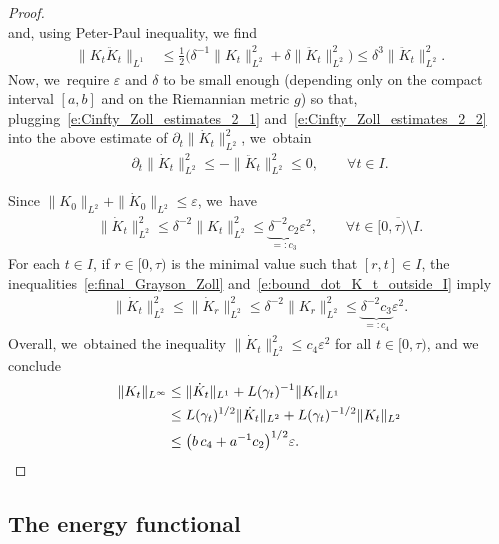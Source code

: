 \documentclass[11pt]{article}
\let\epsilon\varepsilon
\theoremstyle{plain}
\theoremstyle{definition}
\begin{document}
\begin{proof}
\begin{equation}
\end{equation}
and, using Peter-Paul inequality, we find
\begin{equation}
\label{e:Cinfty_Zoll_estimates_2_2}
\begin{split}
\|K_t \ddot K_t\|_{L^1}
&\leq
\tfrac12\big(\delta^{-1}\|K_t\|_{L^2}^2+ \delta\|\ddot K_t\|_{L^2}^2\big)
\leq
\delta^3 \|\ddot K_t\|_{L^2}^2.
\end{split}
\end{equation}
Now, we~require $\epsilon$ and $\delta$ to be small enough (depending only on the compact interval $[a,b]$ and on the Riemannian metric $g$) so that, plugging~\eqref{e:Cinfty_Zoll_estimates_2_1} and~\eqref{e:Cinfty_Zoll_estimates_2_2} into the above estimate of $\partial_t\|\dot K_t\|_{L^2}^2$, we~obtain
\begin{align}
\label{e:final_Grayson_Zoll}
\partial_t\|\dot K_t\|_{L^2}^2
\leq
-\|\ddot K_t\|_{L^2}^2
\leq
0,
\qquad\forall t\in I.
\end{align}

Since $\|K_0\|_{L^2}+\|\dot K_0\|_{L^2}\leq\epsilon$, we~have
\begin{align}
\label{e:bound_dot_K_t_outside_I}
\|\dot K_t\|_{L^2}^2\leq \delta^{-2}\|K_t\|_{L^2}^2\leq \underbrace{\delta^{-2}c_2}_{=:c_3}\epsilon^2,
\qquad\forall t\in\overline{[0,\tau)\setminus I}.
\end{align}
For each $t\in I$, if $r\in[0,\tau)$ is the minimal value such that $[r,t]\in I$, the inequalities~\eqref{e:final_Grayson_Zoll} and~\eqref{e:bound_dot_K_t_outside_I} imply
\begin{align*}
\|\dot K_t\|_{L^2}^2
\leq
\|\dot K_r\|_{L^2}^2
\leq
\delta^{-2}\|K_{r}\|_{L^2}^2
\leq
\underbrace{\delta^{-2} c_3}_{=:c_4} \epsilon^2.
\end{align*}
Overall, we~obtained the inequality $\|\dot K_t\|_{L^2}^2\leq c_4\epsilon^2$ for all $t\in[0,\tau)$, and we conclude
\begin{align*}
\|K_t\|_{L^\infty}
&\leq
\|\dot K_t\|_{L^1} + L(\gamma_t)^{-1}\|K_t\|_{L^1}\\
&\leq
L(\gamma_t)^{1/2}\|\dot K_t\|_{L^2} + L(\gamma_t)^{-1/2}\|K_t\|_{L^2}\\
&\leq\big(b\,c_4 + a^{-1}c_2\big)^{1/2}\epsilon.
\qedhere
\end{align*}
\end{proof}

\subsection{The energy functional}\label{ss:energy}
\end{document}

